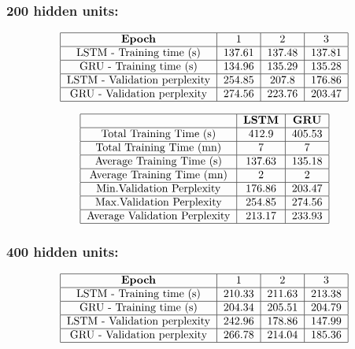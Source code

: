 \documentclass[11pt]{article}
\newcommand{\0}{\mat{0}}
\begin{document}
\begin{itemize}
\begin{enumerate}
	\subsubsection*{\textbf{200 hidden units:}}
	  \[
  	 	\begin{tabular}{| c | c | c | c |}
  	 	 	\hline
	 	 		\textbf{Epoch} & 1 & 2 & 3  \\
	  	 	\hline
	 			LSTM - Training time (s)		& 137.61 & 137.48 & 137.81 \\
	 	 	\hline
				GRU - Training time (s)		& 134.96& 135.29 & 135.28 \\
			\hline 
				LSTM - Validation perplexity	& 254.85 & 207.8 & 176.86 \\
			\hline 
				GRU - Validation perplexity	& 274.56 & 223.76 & 203.47 \\
			\hline
		\end{tabular}
	\] 

	  \[
  	 	\begin{tabular}{| c | c | c |}
  	 	 	\hline
	 	 		& \textbf{LSTM} &  \textbf{GRU} \\
	  	 	\hline
	 			Total Training Time (s)		& 412.9 & 405.53 \\
	 	 	\hline
				Total Training Time (mn)		& 7 & 7 \\
			\hline 
				Average Training Time (s)	 	& 137.63 & 135.18 \\
			\hline 
				Average Training Time (mn)	& 2 & 2 \\
			\hline
				Min.Validation Perplexity		& 176.86 & 203.47 \\
			\hline
				Max.Validation Perplexity		& 254.85 & 274.56 \\
			\hline
				Average Validation Perplexity	& 213.17 & 233.93 \\
			\hline
		\end{tabular}
	\] 

	\subsubsection*{\textbf{400 hidden units:}}
	  \[
  	 	\begin{tabular}{| c | c | c | c |}
  	 	 	\hline
	 	 		\textbf{Epoch} & 1 & 2 & 3  \\
	  	 	\hline
	 			LSTM - Training time (s)		& 210.33 & 211.63 & 213.38 \\
	 	 	\hline
				GRU - Training time (s)		& 204.34 & 205.51 & 204.79 \\
			\hline 
				LSTM - Validation perplexity	& 242.96 & 178.86 & 147.99 \\
			\hline 
				GRU - Validation perplexity	& 266.78 & 214.04 & 185.36 \\
			\hline
		\end{tabular}
	\] 


\end{enumerate}
\end{itemize}
\end{document}
